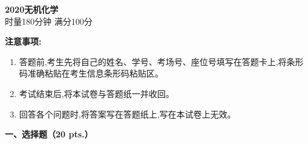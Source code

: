 \begin{center}
    {\LARGE \textbf{2020无机化学}} \\[2ex]
    {\large 时量180分钟 \quad 满分100分}
\end{center}

\vspace{0.5cm}
\noindent\textbf{注意事项:}
\begin{enumerate}[label=\arabic*., parsep=0pt, itemsep=0pt]
    \item 答题前,考生先将自己的姓名、学号、考场号、座位号填写在答题卡上,将条形码准确粘贴在考生信息条形码粘贴区。
    \item 考试结束后,将本试卷与答题纸一并收回。
    \item 回答各个问题时,将答案写在答题纸上,写在本试卷上无效。
\end{enumerate}

\vspace{0.5cm}
\noindent\textbf{一、选择题（20 pts.）}

